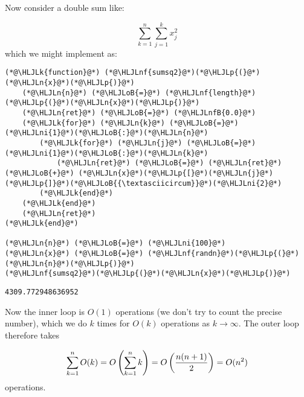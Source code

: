 \documentclass[12pt,a4paper]{article}
\newcommand{\HLJLk}[1]{\textcolor[RGB]{148,91,176}{\textbf{#1}}}
\newcommand{\HLJLn}[1]{#1}
\newcommand{\HLJLnf}[1]{\textcolor[RGB]{66,102,213}{#1}}
\newcommand{\HLJLnfB}[1]{\textcolor[RGB]{59,151,46}{#1}}
\newcommand{\HLJLni}[1]{\textcolor[RGB]{59,151,46}{#1}}
\newcommand{\HLJLoB}[1]{\textcolor[RGB]{102,102,102}{\textbf{#1}}}
\newcommand{\HLJLp}[1]{#1}
\begin{document}
Now consider a double sum like:

\[
\sum_{k=1}^n \sum_{j=1}^k x_j^2
\]
which we might implement as:


\begin{lstlisting}
(*@\HLJLk{function}@*) (*@\HLJLnf{sumsq2}@*)(*@\HLJLp{(}@*)(*@\HLJLn{x}@*)(*@\HLJLp{)}@*)
    (*@\HLJLn{n}@*) (*@\HLJLoB{=}@*) (*@\HLJLnf{length}@*)(*@\HLJLp{(}@*)(*@\HLJLn{x}@*)(*@\HLJLp{)}@*)
    (*@\HLJLn{ret}@*) (*@\HLJLoB{=}@*) (*@\HLJLnfB{0.0}@*)
    (*@\HLJLk{for}@*) (*@\HLJLn{k}@*) (*@\HLJLoB{=}@*) (*@\HLJLni{1}@*)(*@\HLJLoB{:}@*)(*@\HLJLn{n}@*)
        (*@\HLJLk{for}@*) (*@\HLJLn{j}@*) (*@\HLJLoB{=}@*) (*@\HLJLni{1}@*)(*@\HLJLoB{:}@*)(*@\HLJLn{k}@*)
            (*@\HLJLn{ret}@*) (*@\HLJLoB{=}@*) (*@\HLJLn{ret}@*) (*@\HLJLoB{+}@*) (*@\HLJLn{x}@*)(*@\HLJLp{[}@*)(*@\HLJLn{j}@*)(*@\HLJLp{]}@*)(*@\HLJLoB{{\textasciicircum}}@*)(*@\HLJLni{2}@*)
        (*@\HLJLk{end}@*)
    (*@\HLJLk{end}@*)
    (*@\HLJLn{ret}@*)
(*@\HLJLk{end}@*)

(*@\HLJLn{n}@*) (*@\HLJLoB{=}@*) (*@\HLJLni{100}@*)
(*@\HLJLn{x}@*) (*@\HLJLoB{=}@*) (*@\HLJLnf{randn}@*)(*@\HLJLp{(}@*)(*@\HLJLn{n}@*)(*@\HLJLp{)}@*)
(*@\HLJLnf{sumsq2}@*)(*@\HLJLp{(}@*)(*@\HLJLn{x}@*)(*@\HLJLp{)}@*)
\end{lstlisting}

\begin{lstlisting}
4309.772948636952
\end{lstlisting}


Now the inner loop is $O(1)$ operations (we don't try to count the precise number), which we do $k$ times for $O(k)$ operations as $k \ensuremath{\rightarrow} \ensuremath{\infty}$. The outer loop therefore takes

\[
\ensuremath{\sum}_{k = 1}^n O(k) = O\left(\ensuremath{\sum}_{k = 1}^n k\right) = O\left( {n (n+1) \over 2} \right) = O(n^2)
\]
operations.
\end{document}
